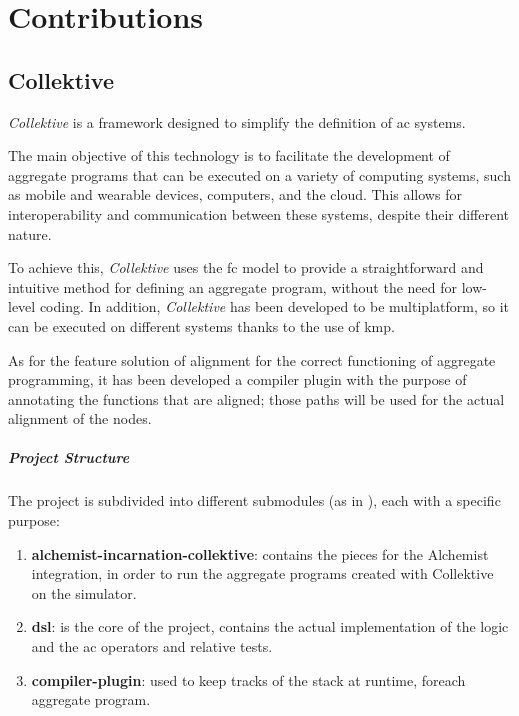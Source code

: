\chapter{Contributions}
\label{ch:contributions}

\section{Collektive}
\label{sec:collektive}
\emph{Collektive} is a framework designed to simplify the definition of \ac{ac} systems.

The main objective of this technology is to facilitate the development of aggregate programs that can be executed on a
variety of computing systems, such as mobile and wearable devices, computers, and the cloud.
This allows for interoperability and communication between these systems, despite their different nature.

To achieve this, \emph{Collektive} uses the \ac{fc} model to provide a straightforward and intuitive method for defining
an aggregate program, without the need for low-level coding.
In addition, \emph{Collektive} has been developed to be multiplatform, so it can be executed on different systems thanks
to the use of \ac{kmp}.

As for the feature solution of alignment for the correct functioning of aggregate programming,
it has been developed a compiler plugin with the purpose of annotating the functions that are aligned;
those paths will be used for the actual alignment of the nodes.

\paragraph{Project Structure}
The project is subdivided into different submodules (as in ), each with a specific purpose:

\begin{enumerate}
    \item \textbf{alchemist-incarnation-collektive}: contains the pieces for the Alchemist integration,
        in order to run the aggregate programs created with Collektive on the simulator.
    \item \textbf{dsl}: is the core of the project, contains the actual implementation of the logic and the \ac{ac} operators
        and relative tests.
    \item \textbf{compiler-plugin}: used to keep tracks of the stack at runtime, foreach aggregate program.
\end{enumerate}

